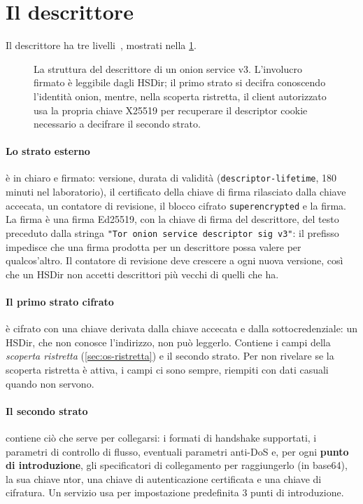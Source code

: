 \section{Il descrittore}\label{sec:os-descrittore}

Il descrittore ha tre livelli~, mostrati nella \cref{fig:os-descrittore}.

\begin{figure}[htbp]
\centering

\caption{La struttura del descrittore di un onion service v3. L'involucro firmato è leggibile dagli HSDir; il primo strato si decifra conoscendo l'identità onion, mentre, nella scoperta ristretta, il client autorizzato usa la propria chiave X25519 per recuperare il descriptor cookie necessario a decifrare il secondo strato.}
\label{fig:os-descrittore}
\end{figure}

\paragraph{Lo strato esterno} è in chiaro e firmato: versione, durata di validità (\texttt{descriptor-lifetime}, 180 minuti nel laboratorio), il certificato della chiave di firma rilasciato dalla chiave accecata, un contatore di revisione, il blocco cifrato \texttt{superencrypted} e la firma. La firma è una firma Ed25519, con la chiave di firma del descrittore, del testo preceduto dalla stringa \texttt{"Tor onion service descriptor sig v3"}: il prefisso impedisce che una firma prodotta per un descrittore possa valere per qualcos'altro. Il contatore di revisione deve crescere a ogni nuova versione, così che un HSDir non accetti descrittori più vecchi di quelli che ha.

\paragraph{Il primo strato cifrato} è cifrato con una chiave derivata dalla chiave accecata e dalla sottocredenziale: un HSDir, che non conosce l'indirizzo, non può leggerlo. Contiene i campi della \emph{scoperta ristretta} (\cref{sec:os-ristretta}) e il secondo strato. Per non rivelare se la scoperta ristretta è attiva, i campi ci sono sempre, riempiti con dati casuali quando non servono.

\paragraph{Il secondo strato} contiene ciò che serve per collegarsi: i formati di handshake supportati, i parametri di controllo di flusso, eventuali parametri anti-DoS e, per ogni \textbf{punto di introduzione}, gli specificatori di collegamento per raggiungerlo (in base64), la sua chiave ntor, una chiave di autenticazione certificata e una chiave di cifratura. Un servizio usa per impostazione predefinita 3 punti di introduzione.

